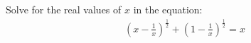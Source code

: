 Solve for the real values of $x$ in the equation:
\begin{align*}
\left(x-\frac{1}{x}\right)^{\tfrac{1}{2}} 
  + \left(1-\frac{1}{x}\right)^{\tfrac{1}{2}} 
  = x
\end{align*}
